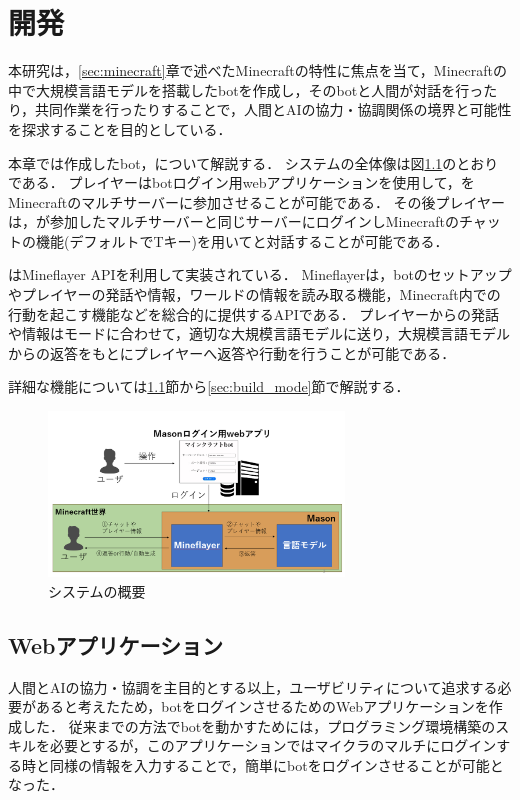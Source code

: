 \chapter{開発} 
\thispagestyle{plain}   %

本研究は，\ref{sec:minecraft}章で述べたMinecraftの特性に焦点を当て，Minecraftの中で大規模言語モデルを搭載したbotを作成し，そのbotと人間が対話を行ったり，共同作業を行ったりすることで，人間とAIの協力・協調関係の境界と可能性を探求することを目的としている．

本章では作成したbot，{\mason}について解説する．
システムの全体像は図\ref{fig:system}のとおりである．
プレイヤーはbotログイン用webアプリケーションを使用して，{\mason}をMinecraftのマルチサーバーに参加させることが可能である．
その後プレイヤーは，{\mason}が参加したマルチサーバーと同じサーバーにログインしMinecraftのチャットの機能(デフォルトでTキー)を用いて{\mason}と対話することが可能である．

{\mason}はMineflayer API\cite{bib:Mineflayer}を利用して実装されている．
Mineflayerは，botのセットアップやプレイヤーの発話や情報，ワールドの情報を読み取る機能，Minecraft内での行動を起こす機能などを総合的に提供するAPIである．
プレイヤーからの発話や情報はモードに合わせて，適切な大規模言語モデルに送り，大規模言語モデルからの返答をもとにプレイヤーへ返答や行動を行うことが可能である．

詳細な機能については\ref{sec:webapp}節から\ref{sec:build_mode}節で解説する．

\begin{figure}[H]
    \centering
    \includegraphics[width=0.7\textwidth]{fig/my_system.PNG}
    \caption{システムの概要}
    \label{fig:system}
\end{figure}

\section{Webアプリケーション}\label{sec:webapp}
人間とAIの協力・協調を主目的とする以上，ユーザビリティについて追求する必要があると考えたため，botをログインさせるためのWebアプリケーションを作成した．
従来までの方法でbotを動かすためには，プログラミング環境構築のスキルを必要とするが，このアプリケーションではマイクラのマルチにログインする時と同様の情報を入力することで，簡単にbotをログインさせることが可能となった．

